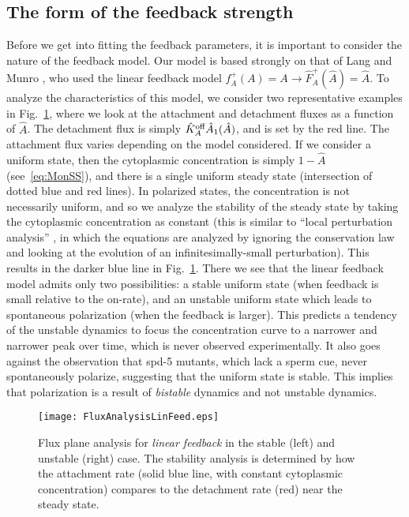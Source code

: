 \documentclass[11pt]{article}
\newcommand{\6}[1]{#1_{\text{6}}}
\newcommand{\3}[1]{#1_{\text{3}}}
\begin{document}
\subsection{The form of the feedback strength }
Before we get into fitting the feedback parameters, it is important to consider the nature of the feedback model. Our model is based strongly on that of Lang and Munro \cite{lang2022oligomerization}, who used the linear feedback model $f_A^+(A)=A \rightarrow \hat F_A^+(\hat A)=\hat A.$
To analyze the characteristics of this model, we consider two representative examples in Fig.\ \ref{fig:P3Linear}, where we look at the attachment and detachment fluxes as a function of $\hat A$. The detachment flux is simply $\hat{K}^\text{off}_A \hat A_1( \hat A)$, and is set by the red line. The attachment flux varies depending on the model considered. If we consider a uniform state, then the cytoplasmic concentration is simply $1-\hat A$ (see\ \eqref{eq:MonSS}), and there is a single uniform steady state (intersection of dotted blue and red lines). In polarized states, the concentration is not necessarily uniform, and so we analyze the stability of the steady state by taking the cytoplasmic concentration as constant (this is similar to ``local perturbation analysis'' \cite{holmes2015local}, in which the equations are analyzed by ignoring the conservation law and looking at the evolution of an infinitesimally-small perturbation). This results in the darker blue line in Fig.\ \ref{fig:P3Linear}. There we see that the linear feedback model admits only two possibilities: a stable uniform state (when feedback is small relative to the on-rate), and an unstable uniform state which leads to spontaneous polarization (when the feedback is larger). This predicts a tendency of the unstable dynamics to focus the concentration curve to a narrower and narrower peak over time, which is never observed experimentally. It also goes against the observation that spd-5 mutants, which lack a sperm cue, never spontaneously polarize, suggesting that the uniform state is stable. This implies that polarization is a result of \emph{bistable} dynamics and not unstable dynamics.

\begin{figure}
\centering
\texttt{[image: FluxAnalysisLinFeed.eps]}
\caption{\label{fig:P3Linear}Flux plane analysis for \emph{linear feedback} in the stable (left) and unstable (right) case. The stability analysis is determined by how the attachment rate (solid blue line, with constant cytoplasmic concentration) compares to the detachment rate (red) near the steady state.}
\end{figure}
\end{document}
